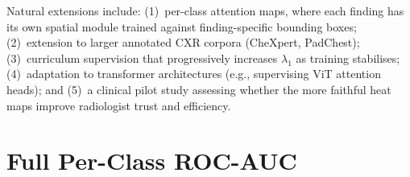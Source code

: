 \documentclass[12pt, a4paper]{article}
\begin{document}
Natural extensions include: (1)~per-class attention maps, where each finding has its own
spatial module trained against finding-specific bounding boxes; (2)~extension to larger
annotated CXR corpora (CheXpert, PadChest); (3)~curriculum supervision that progressively
increases $\lambda_1$ as training stabilises; (4)~adaptation to transformer architectures
(e.g., supervising ViT attention heads); and (5)~a clinical pilot study assessing whether
the more faithful heat maps improve radiologist trust and efficiency.




\appendix
\section{Full Per-Class ROC-AUC}
\label{app:perclass}
\end{document}
